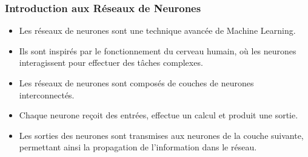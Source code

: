 \documentclass{beamer}
\begin{document}
\begin{frame}
	\frametitle{Introduction aux Réseaux de Neurones}
	
	\begin{itemize}
		\item Les réseaux de neurones sont une technique avancée de Machine Learning.
		\item Ils sont inspirés par le fonctionnement du cerveau humain, où les neurones interagissent pour effectuer des tâches complexes.
		\item Les réseaux de neurones sont composés de couches de neurones interconnectés.
		\item Chaque neurone reçoit des entrées, effectue un calcul et produit une sortie.
		\item Les sorties des neurones sont transmises aux neurones de la couche suivante, permettant ainsi la propagation de l'information dans le réseau.
	\end{itemize}
	
\end{frame}
\end{document}
